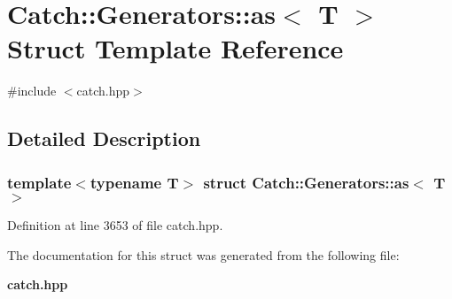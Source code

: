 \section{Catch\+::Generators\+::as$<$ T $>$ Struct Template Reference}
\label{struct_catch_1_1_generators_1_1as}


{\ttfamily \#include $<$catch.\+hpp$>$}



\subsection{Detailed Description}
\subsubsection*{template$<$typename T$>$\newline
struct Catch\+::\+Generators\+::as$<$ T $>$}



Definition at line 3653 of file catch.\+hpp.



The documentation for this struct was generated from the following file\+:\begin{DoxyCompactItemize}
\item 
\textbf{ catch.\+hpp}\end{DoxyCompactItemize}
